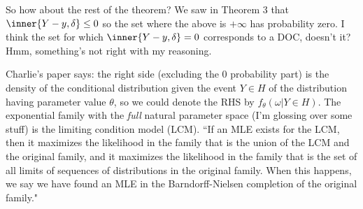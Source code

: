 So how about the rest of the theorem?  We saw in Theorem 3 that $\inner{Y-y,\delta} 
\leq 0$ so the set where the above is $+\infty$ has probability zero.  I think the 
set for which $\inner{Y-y,\delta} = 0$ corresponds to a DOC, doesn't it?  Hmm, 
something's not right with my reasoning.

Charlie's paper says: the right side (excluding the 0 probability part) is the 
density of the conditional distribution given the event $Y \in H$ of the distribution 
having parameter value $\theta$, so we could denote the RHS by $f_\theta(\omega | Y 
\in H)$.  The exponential family with the \emph{full} natural parameter space (I'm 
glossing over some stuff) is the limiting condition model (LCM).  ``If an MLE exists 
for the LCM, then it maximizes the likelihood in the family that is the union of the 
LCM and the original family, and it maximizes the likelihood in the family that is 
the set of all limits of sequences of distributions in the original family.  When 
this happens, we say we have found an MLE in the Barndorff-Nielsen completion of the 
original family."


